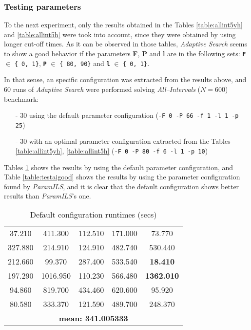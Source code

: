 \subsubsection{ Testing parameters}

To the next experiment, only the results obtained in the Tables \ref{table:allint5yh} and \ref{table:allint5h} were took into account, since they were obtained by using longer cut-off times. As it can be observed in those tables, {\it Adaptive Search} seems to show a good behavior if the parameters {\bf F}, {\bf P} and {\bf l} are in the following sets: \texttt{\bf F} $\in$ \texttt{\{ 0, 1\}}, \texttt{\bf P} $\in$ \texttt{\{ 80, 90\}} and \texttt{\bf l} $\in$ \texttt{\{ 0, 1\}}.


In that sense, an specific configuration was extracted from the results above, and 60 runs of {\it Adaptive Search} were performed solving {\it All--Intervals} ($N = 600$) benchmark:
\begin{itemize}
	\item[-] 30 using the default parameter configuration (\texttt{-F 0 -P 66 -f 1 -l 1 -p 25})
	\item[-] 30 with an optimal parameter configuration extracted from the Tables \ref{table:allint5yh}, \ref{table:allint5h} (\texttt{-F 0 -P 80 -f 6 -l 1 -p 10}) 
\end{itemize}

Tables \ref{table:testaibad} shows the results by using the default parameter configuration, and Table \ref{table:testaigood} shows the results by using the parameter configuration found by {\it ParamILS}, and it is clear that the default configuration shows better results than {\it ParamILS}'s one.

\begin{table}[H]
\caption{Default configuration runtimes (secs)}
\centering
\renewcommand{\arraystretch}{1.2}
\begin{tabular}{|ccccc|}
	\hline
	37.210 & 411.300 & 112.510 & 171.000 & 73.770 \\ 
	327.880 & 214.910 & 124.910 & 482.740 & 530.440 \\  
	\hline 
	212.660 & 99.370 & 287.400 & 533.540 & \textcolor{naranja}{\bf 18.410} \\ 
	197.290 & 1016.950 & 110.230 & 566.480 & \textcolor{intenso}{\bf 1362.010} \\  
	\hline 
	94.860 & 819.700 & 434.460 & 620.600 & 95.920 \\ 
	80.580 & 333.370 & 121.590 & 489.700 & 248.370 \\  
	\hline 
	\multicolumn{5}{|c|}{\bf mean: 341.005333}\\
	\hline
\end{tabular}
\label{table:testaibad}
\end{table}
	
